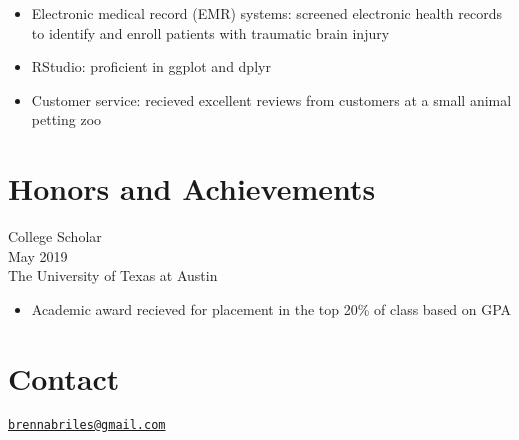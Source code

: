 \documentclass[]{article}
\providecommand{\tightlist}{%
  \setlength{\itemsep}{0pt}\setlength{\parskip}{0pt}}
\begin{document}
\begin{itemize}
\tightlist
\item
  Electronic medical record (EMR) systems: screened electronic health
  records to identify and enroll patients with traumatic brain injury\\
\item
  RStudio: proficient in ggplot and dplyr\\
\item
  Customer service: recieved excellent reviews from customers at a small
  animal petting zoo
\end{itemize}

\section{Honors and Achievements}\label{honors-and-achievements}

College Scholar\\
May 2019\\
The University of Texas at Austin

\begin{itemize}
\tightlist
\item
  Academic award recieved for placement in the top 20\% of class based
  on GPA
\end{itemize}

\section{Contact}\label{contact}

\href{mailto:brennabriles@gmail.com}{\nolinkurl{brennabriles@gmail.com}}
\end{document}
